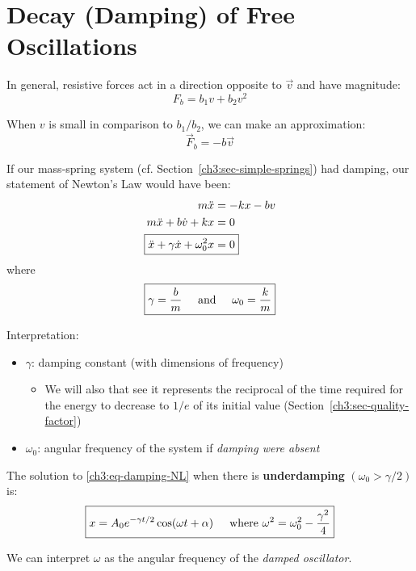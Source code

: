 \section{Decay (Damping) of Free Oscillations}

In general, resistive forces act in a direction opposite to $\vec{v}$ and have magnitude:
\[ F_b = b_1v + b_2v^2\]

When $v$ is small in comparison to $b_1/b_2$, we can make an approximation:
\begin{equation*}
	\boxed{\vec{F}_b = -b\vec{v}}
\end{equation*}

If our mass-spring system (cf. Section~\ref{ch3:sec-simple-springs}) had damping, our statement of Newton's Law would have been:
\begin{align}
	m\ddot{x} &= -kx - bv \notag \\
	m\ddot{x} + b\dot{v} + kx &= 0 \notag  \\
	\Aboxed{\ddot{x} + \gamma \dot{x} + \omega_0^2 x &= 0} \label{ch3:eq-damping-NL}
\end{align}
where
\[ \boxed{\gamma = \frac{b}{m} \hspace{0.5cm}\text{and}\hspace{0.5cm} \omega_0 = \frac{k}{m}} \]

Interpretation:
\begin{itemize}
	\item $\gamma$: damping constant (with dimensions of frequency)
	\begin{itemize}
		\item We will also that see it represents the reciprocal of the time required for the energy to decrease to $1/e$ of its initial value (Section~\ref{ch3:sec-quality-factor})
	\end{itemize}
	\item $\omega_0$: angular frequency of the system if \emph{damping were absent}
\end{itemize}

The solution to \eqref{ch3:eq-damping-NL} when there is \textbf{underdamping} $(\omega_0>\gamma/2)$ is:
\begin{equation}
	\boxed{
		x = A_0 e^{-\gamma t/2} \cos(\omega t + \alpha) \hspace{0.5cm}\text{where } \omega ^2 = \omega_0^2 - \frac{\gamma^2}{4} 
	}	\label{ch3:eq-damping-solution}
\end{equation}

We can interpret $\omega$ as the angular frequency of the \emph{damped oscillator}.


